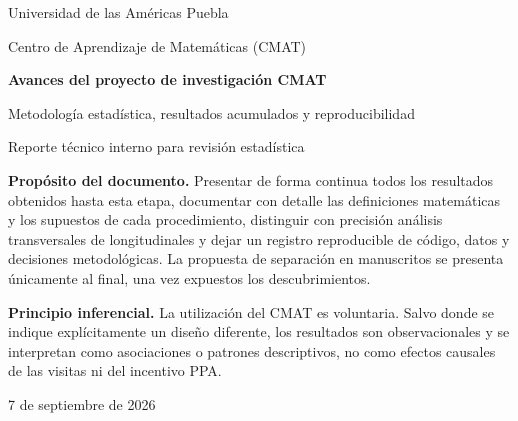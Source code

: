 \documentclass[11pt,letterpaper]{article}
\begin{document}
\begin{titlepage}
\centering
\vspace*{1.2cm}
{\Large Universidad de las Américas Puebla\par}
\vspace{0.25cm}
{\Large Centro de Aprendizaje de Matemáticas (CMAT)\par}
\vspace{1.45cm}
{\Huge\bfseries Avances del proyecto de investigación CMAT\par}
\vspace{0.4cm}
{\LARGE Metodología estadística, resultados acumulados y reproducibilidad\par}
\vspace{0.75cm}
{\large Reporte técnico interno para revisión estadística\par}
\vfill
\begin{minipage}{0.88\textwidth}
\small
\textbf{Propósito del documento.} Presentar de forma continua todos los resultados obtenidos hasta esta etapa, documentar con detalle las definiciones matemáticas y los supuestos de cada procedimiento, distinguir con precisión análisis transversales de longitudinales y dejar un registro reproducible de código, datos y decisiones metodológicas. La propuesta de separación en manuscritos se presenta únicamente al final, una vez expuestos los descubrimientos.

\medskip
\textbf{Principio inferencial.} La utilización del CMAT es voluntaria. Salvo donde se indique explícitamente un diseño diferente, los resultados son observacionales y se interpretan como asociaciones o patrones descriptivos, no como efectos causales de las visitas ni del incentivo PPA.
\end{minipage}
\vfill
{\large 7 de septiembre de 2026\par}
\end{titlepage}
\end{document}
